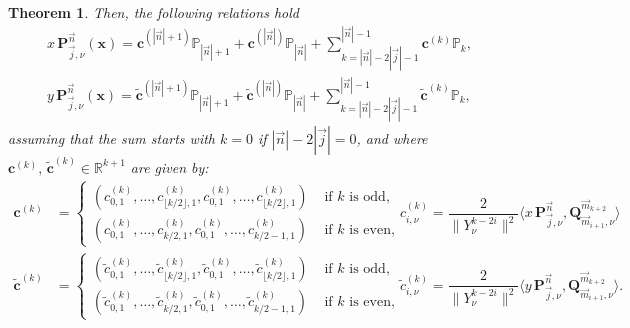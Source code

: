 \documentclass[a4paper]{article}
\theoremstyle{plain}
\newtheorem{theorem}{Theorem}
\theoremstyle{definition}
\begin{document}
\begin{theorem}
        Then, the following relations hold
        \begin{equation}
        \label{eq:NNR}
            \begin{aligned}
                x\, \mathbf P_{\vec j,\nu}^{\vec n}(\mathbf x) = \mathbf c^{(|\vec n|+1)}\mathbb P_{|\vec n|+1} + \mathbf c^{(|\vec n|)}\mathbb P_{|\vec n|} +  \sum_{k=|\vec n|-2|\vec j|-1}^{|\vec n|-1}\mathbf c^{(k)}\mathbb P_{k}, \\
                y\, \mathbf P_{\vec j,\nu}^{\vec n}(\mathbf x) = \tilde{\mathbf c}^{(|\vec n|+1)}\mathbb P_{|\vec n|+1} + \tilde{\mathbf c}^{(|\vec n|)}\mathbb P_{|\vec n|} +  \sum_{k=|\vec n|-2|\vec j|-1}^{|\vec n|-1}\tilde{\mathbf c}^{(k)}\mathbb P_{k}, 
            \end{aligned}
        \end{equation}
        assuming that the sum starts with $k=0$ if $|\vec n|-2|\vec j|=0$, and where $\mathbf c^{(k)},\,\tilde{\mathbf c}^{(k)}\in\mathbb R^{k+1}$ are given by:
        \begin{equation}
        \label{eq:NNRR-coefficients-x}
        \begin{aligned}
            \mathbf c^{(k)} &=\begin{cases}
                (c^{(k)}_{0,1},\dots,c^{(k)}_{\lfloor k/2 \rfloor ,1}, c^{(k)}_{0,1}, \dots, c^{(k)}_{\lfloor k/2 \rfloor,1}) & \text{ if }k \text{ is odd},\\
                (c^{(k)}_{0,1},\dots,c^{(k)}_{k/2,1}, c^{(k)}_{0,1}, \dots, c^{(k)}_{k/2-1,1}) & \text{ if }k \text{ is even}, 
            \end{cases} &
            c^{(k)}_{i,\nu} = \dfrac{2}{\|Y_{\nu}^{k-2i}\|^2} \langle x\, \mathbf P_{\vec j,\nu}^{\vec n}, \mathbf Q^{\vec m_{k+2}}_{\vec m_{i+1},\nu}\rangle
        \end{aligned}
        \end{equation}
        \begin{equation}
        \label{eq:NNRR-coefficients-y}
        \begin{aligned}
            \tilde{\mathbf c}^{(k)} &=\begin{cases}
                (\tilde c^{(k)}_{0,1},\dots,\tilde c^{(k)}_{\lfloor k/2 \rfloor ,1}, \tilde c^{(k)}_{0,1}, \dots, \tilde c^{(k)}_{\lfloor k/2 \rfloor,1}) & \text{ if }k \text{ is odd},\\
                (\tilde c^{(k)}_{0,1},\dots,\tilde c^{(k)}_{k/2,1}, \tilde c^{(k)}_{0,1}, \dots, \tilde c^{(k)}_{k/2-1,1}) & \text{ if }k \text{ is even}, 
            \end{cases} &
            \tilde c^{(k)}_{i,\nu} = \dfrac{2}{\|Y_{\nu}^{k-2i}\|^2} \langle y\, \mathbf P_{\vec j,\nu}^{\vec n}, \mathbf Q^{\vec m_{k+2}}_{\vec m_{i+1},\nu}\rangle.
        \end{aligned}
        \end{equation}
        
    \end{theorem}
    
\end{document}
